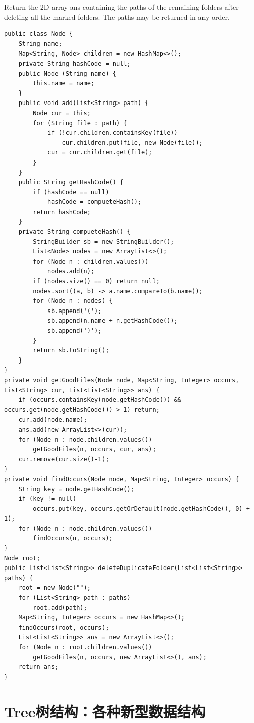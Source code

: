 \documentclass[9pt, b5paaper]{book}
\begin{document}
Return the 2D array ans containing the paths of the remaining folders after deleting all the marked folders. The paths may be returned in any order.
\begin{verbatim}
public class Node {
    String name;
    Map<String, Node> children = new HashMap<>();
    private String hashCode = null;
    public Node (String name) {
        this.name = name;
    }
    public void add(List<String> path) {
        Node cur = this;
        for (String file : path) {
            if (!cur.children.containsKey(file))
                cur.children.put(file, new Node(file));
            cur = cur.children.get(file);
        }
    }
    public String getHashCode() {
        if (hashCode == null)
            hashCode = compueteHash();
        return hashCode;
    }
    private String compueteHash() {
        StringBuilder sb = new StringBuilder();
        List<Node> nodes = new ArrayList<>();
        for (Node n : children.values()) 
            nodes.add(n);
        if (nodes.size() == 0) return null;
        nodes.sort((a, b) -> a.name.compareTo(b.name));
        for (Node n : nodes) {
            sb.append('(');
            sb.append(n.name + n.getHashCode());
            sb.append(')');
        }
        return sb.toString();
    }
}
private void getGoodFiles(Node node, Map<String, Integer> occurs, List<String> cur, List<List<String>> ans) {
    if (occurs.containsKey(node.getHashCode()) && occurs.get(node.getHashCode()) > 1) return;
    cur.add(node.name);
    ans.add(new ArrayList<>(cur));
    for (Node n : node.children.values()) 
        getGoodFiles(n, occurs, cur, ans);
    cur.remove(cur.size()-1);
}
private void findOccurs(Node node, Map<String, Integer> occurs) {
    String key = node.getHashCode();
    if (key != null)
        occurs.put(key, occurs.getOrDefault(node.getHashCode(), 0) + 1);
    for (Node n : node.children.values()) 
        findOccurs(n, occurs);
}
Node root;
public List<List<String>> deleteDuplicateFolder(List<List<String>> paths) {
    root = new Node("");
    for (List<String> path : paths) 
        root.add(path);
    Map<String, Integer> occurs = new HashMap<>();
    findOccurs(root, occurs);
    List<List<String>> ans = new ArrayList<>();
    for (Node n : root.children.values()) 
        getGoodFiles(n, occurs, new ArrayList<>(), ans);
    return ans;
}
\end{verbatim}


\chapter{Tree树结构：各种新型数据结构}
\label{sec-3}
\end{document}

